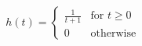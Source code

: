 \documentclass[preview]{standalone}
\begin{document}
\begin{align*}
h(t) = \begin{cases} \frac{1}{t + 1} & \text{for } t \geq 0 \\ 0 & \text{otherwise} \end{cases}
\end{align*}
\end{document}
